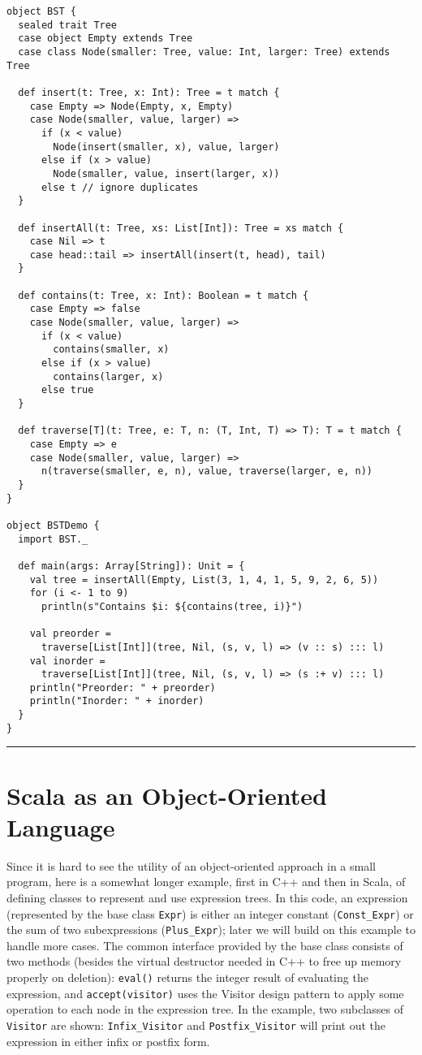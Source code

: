 \documentclass[11pt]{article}
\begin{document}
\begin{verbatim}
object BST {
  sealed trait Tree
  case object Empty extends Tree
  case class Node(smaller: Tree, value: Int, larger: Tree) extends Tree

  def insert(t: Tree, x: Int): Tree = t match {
    case Empty => Node(Empty, x, Empty)
    case Node(smaller, value, larger) =>
      if (x < value)
        Node(insert(smaller, x), value, larger)
      else if (x > value)
        Node(smaller, value, insert(larger, x))
      else t // ignore duplicates
  }

  def insertAll(t: Tree, xs: List[Int]): Tree = xs match {
    case Nil => t
    case head::tail => insertAll(insert(t, head), tail)
  }

  def contains(t: Tree, x: Int): Boolean = t match {
    case Empty => false
    case Node(smaller, value, larger) =>
      if (x < value)
        contains(smaller, x)
      else if (x > value)
        contains(larger, x)
      else true
  }

  def traverse[T](t: Tree, e: T, n: (T, Int, T) => T): T = t match {
    case Empty => e
    case Node(smaller, value, larger) =>
      n(traverse(smaller, e, n), value, traverse(larger, e, n))
  }
}

object BSTDemo {
  import BST._
  
  def main(args: Array[String]): Unit = {
    val tree = insertAll(Empty, List(3, 1, 4, 1, 5, 9, 2, 6, 5))
    for (i <- 1 to 9)
      println(s"Contains $i: ${contains(tree, i)}")
      
    val preorder =
      traverse[List[Int]](tree, Nil, (s, v, l) => (v :: s) ::: l)
    val inorder =
      traverse[List[Int]](tree, Nil, (s, v, l) => (s :+ v) ::: l)
    println("Preorder: " + preorder)
    println("Inorder: " + inorder)
  }
}
\end{verbatim}
\rule{\textwidth}{1pt}

\section{Scala as an Object-Oriented Language}

Since it is hard to see the utility of an object-oriented approach in a small program, here is a somewhat longer example, first in C++ and then in Scala, of defining classes to represent and use expression trees. In this code, an expression (represented by the base class \verb|Expr|) is either an integer constant (\verb|Const_Expr|) or the sum of two subexpressions (\verb|Plus_Expr|); later we will build on this example to handle more cases. The common interface provided by the base class consists of two methods (besides the virtual destructor needed in C++ to free up memory properly on deletion): \verb|eval()| returns the integer result of evaluating the expression, and \verb|accept(visitor)| uses the Visitor design pattern to apply some operation to each node in the expression tree. In the example, two subclasses of \verb|Visitor| are shown: \verb|Infix_Visitor| and \verb|Postfix_Visitor| will print out the expression in either infix or postfix form.
\end{document}
